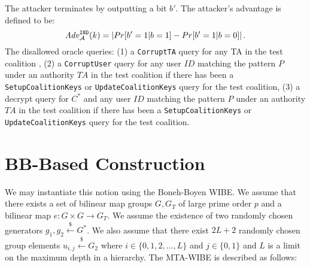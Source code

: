 \documentclass{llncs}
\newcommand{\A}{\mathcal{A}}
\newcommand{\ID}{\mathit{ID}}
\newcommand{\TA}{\mathit{TA}}
\newcommand{\getsr}{\stackrel{{\scriptscriptstyle\$}}{\gets}}
\newcommand{\adv}[2]{\mathit{Adv}_{#1}^{\tiny \texttt{#2}}}
\begin{document}
The attacker terminates by outputting a bit $b'$. The attacker's
advantage is defined to be:
\begin{displaymath}
\adv{\A}{IND}(k) = |Pr[b'=1|b=1]-Pr[b'=1|b=0]| \, .
\end{displaymath}
The disallowed oracle queries: (1) a \texttt{CorruptTA} query for
any TA in the test coalition , (2) a \texttt{CorruptUser} query for
any user $\ID$ matching the pattern $\mathit{P}$ under an authority
$\TA$ in the test coalition if there has been a
\texttt{SetupCoalitionKeys} or \texttt{UpdateCoalitionKeys} query
for the test coalition, (3) a decrypt query for $C^{*}$ and any user
$\ID$ matching the pattern $\mathit{P}$ under an authority $\TA$ in
the test coalition if there has been a \texttt{SetupCoalitionKeys}
or \texttt{UpdateCoalitionKeys} query for the test coalition.


\section{BB-Based Construction}

We may instantiate this notion using the Boneh-Boyen WIBE. We assume that there exists a set of bilinear map groups $G, G_{T}$ of large prime order $p$ and a bilinear map $e: G \times G \rightarrow G_{T}$. We assume the existence of two randomly chosen generators $g_{1},g_{2}\getsr G^{*}$. We also assume that there exist $2L+2$ randomly chosen group elements $u_{i,j} \getsr G_{2}$ where $i\in \{0,1,2,\ldots,L\}$ and $j\in \{0,1\}$ and $L$ is a limit on the maximum depth in a hierarchy. The MTA-WIBE is described as follows:
\end{document}
